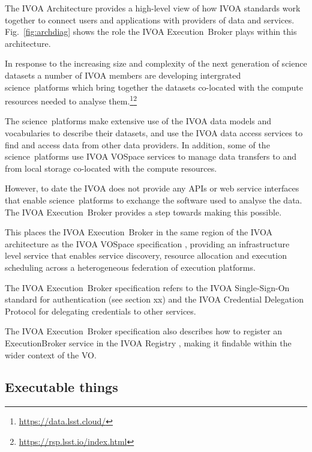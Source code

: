 \documentclass[11pt,a4paper]{ivoa}
\newcommand{\webservice} {web service}
\newcommand{\ivoa} {IVOA}
\newcommand{\vospace} {VOSpace}
\newcommand{\execbrokerclass} {ExecutionBroker}
\newcommand{\executionbroker} {Execution~Broker}
\newcommand{\footurl}[1] {\footnote{\url{#1}}}
\newcommand{\dataset} {dataset}
\newcommand{\scienceplatform} {science~platform}
\begin{document}
The IVOA Architecture\citep{2010ivoa.rept.1123A} provides a high-level view of how IVOA
standards work together to connect users and applications with providers of data
and services.
Fig.~\ref{fig:archdiag} shows the role the \ivoa{} \executionbroker{} plays within this architecture.

In response to the increasing size and complexity of the next generation of science \dataset{}s
a number of \ivoa{} members are developing intergrated \scienceplatform{}s which bring
together the \dataset{}s co-located with the compute resources needed to analyse
them.\footurl{https://data.lsst.cloud/}\footurl{https://rsp.lsst.io/index.html}

The \scienceplatform{}s make extensive use of the \ivoa{} data models and
vocabularies to describe their \dataset{}s, and use the \ivoa{} data access
services to find and access data from other data providers.
In addition, some of the \scienceplatform{}s use \ivoa{} \vospace{} services to manage
data transfers to and from local storage co-located with the compute resources.

However, to date the \ivoa{} does not provide any APIs or \webservice{} interfaces that
enable \scienceplatform{}s to exchange the software used to analyse the data.
The \ivoa{} \executionbroker{} provides a step towards making this possible.

This places the \ivoa{} \executionbroker{} in the same region of the \ivoa{} architecture
as the \ivoa{} \vospace{} specification \citep{2009ivoa.specQ1007G},
providing an infrastructure level service that enables service discovery,
resource allocation and execution scheduling across a heterogeneous federation
of execution platforms.

The \ivoa{} \executionbroker{} specification refers to the
\ivoa{} Single-Sign-On standard \citep{2017ivoa.spec.0524T}
for authentication (see section xx) %
and the
\ivoa{} Credential Delegation Protocol \citep{2010ivoa.spec.0218P}
for delegating credentials to other services.

The \ivoa{} \executionbroker{} specification also describes how to register
an \execbrokerclass{} service in the
\ivoa{} Registry \citep{2009ivoa.spec.1104B},
making it findable within the wider context of the VO.

\subsection{Executable things}
\label{executablething}
\end{document}
